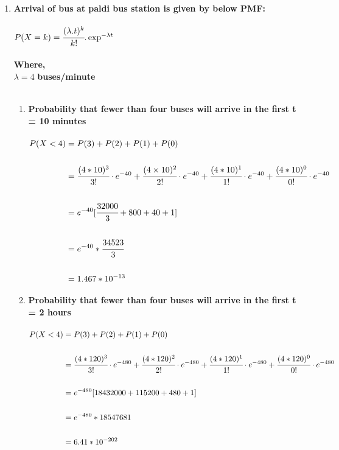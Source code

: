 \documentclass{article}
\begin{document}
\begin{enumerate}
\newpage
\item\large
\textbf{Arrival of bus at paldi bus station is given by below PMF:} \\\\
$ P(X=k) = \cfrac{(\lambda .t)^k}{k!} . \exp^{- \lambda t}$ \\\\
\textbf{Where,}\\
$ \lambda = 4$ \textbf{buses/minute}\\\\
\begin{enumerate}
\item \textbf{Probability that fewer than four buses will arrive in the first t = 10 minutes}\\\\
$\begin{aligned}
P(X<4) &= P(3) + P(2) + P(1) + P(0) \\\\
 &= \cfrac{(4 * 10)^3}{3!} \cdot e^{-40} + \cfrac{(4 \times 10)^2}{2!} \cdot e^{-40} + \cfrac{(4 * 10)^1}{1!} \cdot e^{-40} + \cfrac{(4 * 10)^0}{0!} \cdot e^{-40}\\\\
 &= e^{-40} [\cfrac{32000}{3} + 800 + 40 + 1 ]\\\\
 &= e^{-40} * \cfrac{34523}{3}\\\\
 &= 1.467 * 10^{-13}
\end{aligned}$

\newpage
\item
\large
\textbf{Probability that fewer than four buses will arrive in the first t = 2 hours}\\\\
$\begin{aligned}
P(X<4) &= P(3) + P(2) + P(1) + P(0) \\\\
 &= \cfrac{(4 * 120)^3}{3!} \cdot e^{-480} + \cfrac{(4 * 120)^2}{2!} \cdot e^{-480} + \cfrac{(4 * 120)^1}{1!} \cdot e^{-480} + \cfrac{(4 * 120)^0}{0!} \cdot e^{-480}\\\\
 &= e^{-480} [18432000 + 115200 + 480 + 1]\\\\
 &= e^{-480}* 18547681\\\\
 &= 6.41 *  10^{-202}
\end{aligned}$
\end{enumerate}


\end{enumerate}
\end{document}
